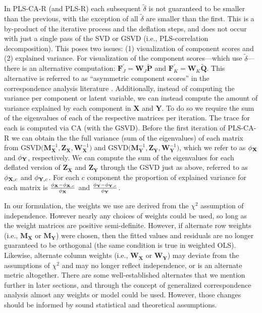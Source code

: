 \documentclass[12pt]{article}
\begin{document}
In PLS-CA-R (and PLS-R) each subsequent \(\widetilde{\delta}\) is not
guaranteed to be smaller than the previous, with the exception of all
\(\widetilde \delta\) are smaller than the first. This is a by-product
of the iterative process and the deflation steps, and does not occur
with just a single pass of the SVD or GSVD (i.e., PLS-correlation
decomposition). This poses two issues: (1) visualization of component
scores and (2) explained variance. For visualization of the component
scores---which use \(\widetilde \delta\)---there is an alternative
computation:
\({\mathbf F}^{'}_{J} = {\mathbf W}_{J}\widetilde{\mathbf P}\) and
\({\mathbf F}^{'}_{K} = {\mathbf W}_{K}\widetilde{\mathbf Q}\). This
alternative is referred to as ``asymmetric component scores'' in the
correspondence analysis literature
\citep{abdi2014correspondence, greenacre1993biplots}. Additionally,
instead of computing the variance per component or latent variable, we
can instead compute the amount of variance explained by each component
in \(\mathbf X\) and \(\mathbf Y\). To do so we require the sum of the
eigenvalues of each of the respective matrices per iteration. The trace
for each is computed via CA (with the GSVD). Before the first iteration
of PLS-CA-R we can obtain the the full variance (sum of the eigenvalues)
of each matrix from
\(\mathrm{GSVD(} {\mathbf M}^{-1}_{\mathbf X}, {\mathbf Z}_{\mathbf X}, {\mathbf W}^{-1}_{\mathbf X} \mathrm{)}\)
and
\(\mathrm{GSVD(} {\mathbf M}^{-1}_{\mathbf Y}, {\mathbf Z}_{\mathbf Y}, {\mathbf W}^{-1}_{\mathbf Y} \mathrm{)}\),
which we refer to as \({\phi}_{\bf X}\) and \({\phi}_{\bf Y}\),
respectively. We can compute the sum of the eigenvalues for each
deflated version of \({\mathbf Z}_{\mathbf X}\) and
\({\mathbf Z}_{\mathbf Y}\) through the GSVD just as above, referred to
as \({\phi}_{{\bf X},c}\) and \({\phi}_{{\bf Y},c}\). For each \(c\)
component the proportion of explained variance for each matrix is
\(\frac{{\phi}_{\bf X} - {\phi}_{{\bf X},c}}{{\phi}_{\bf X}}\) and
\(\frac{{\phi}_{\bf Y} - {\phi}_{{\bf Y},c}}{{\phi}_{\bf Y}}\).

In our formulation, the weights we use are derived from the \(\chi^2\)
assumption of independence. However nearly any choices of weights could
be used, so long as the weight matrices are positive semi-definite.
However, if alternate row weights (i.e., \({\mathbf M}_{\mathbf X}\) or
\({\mathbf M}_{\mathbf Y}\)) were chosen, then the fitted values and
residuals are no longer guaranteed to be orthogonal (the same condition
is true in weighted OLS). Likewise, alternate column weights (i.e.,
\({\mathbf W}_{\mathbf X}\) or \({\mathbf W}_{\mathbf Y}\)) may deviate
from the assumptions of \(\chi^2\) and may no longer reflect
independence, or is an alternate metric altogether. There are some
well-established alternates that we mention further in later sections,
and through the concept of generalized correspondence analysis
\citep{escofier1983analyse, escofier1984analyse} almost any weights or
model could be used. However, those changes should be informed by sound
statistical and theoretical assumptions.
\end{document}
